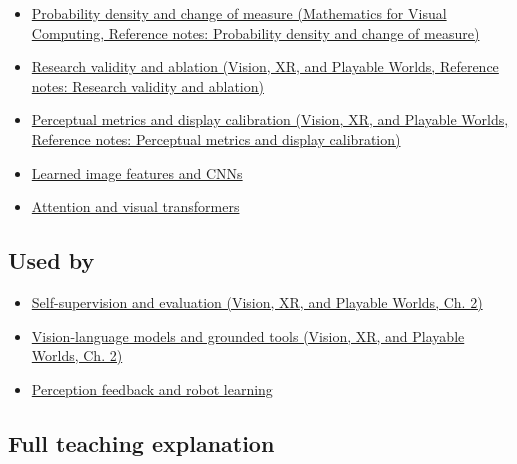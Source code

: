 \hypertarget{appendix-772f1fd96148-prerequisites}{}

\begin{itemize}
\tightlist
\item
  \href{../02-Mathematics-for-Visual-Computing/main.pdf\#nameddest=appendix-4815cd87ab8b}{Probability density and change of measure (Mathematics for Visual Computing, Reference notes: Probability density and change of measure)}
\item
  \href{../07-Vision-XR-and-Playable-Worlds/main.pdf\#nameddest=appendix-65788587ef78}{Research validity and ablation (Vision, XR, and Playable Worlds, Reference notes: Research validity and ablation)}
\item
  \href{../07-Vision-XR-and-Playable-Worlds/main.pdf\#nameddest=appendix-b2c1846508bf}{Perceptual metrics and display calibration (Vision, XR, and Playable Worlds, Reference notes: Perceptual metrics and display calibration)}
\item
  \hyperref[appendix-47c51ea026fb]{Learned image features and CNNs}
\item
  \hyperref[appendix-a9d5dfdd164a]{Attention and visual transformers}
\end{itemize}

\subsection{Used by}\label{appendix-772f1fd96148-used-by}

\hypertarget{appendix-772f1fd96148-used-by}{}

\begin{itemize}
\tightlist
\item
  \href{../07-Vision-XR-and-Playable-Worlds/main.pdf\#nameddest=04-visual-computing-ii-ch031-self-supervision-and-evaluation}{Self-supervision and evaluation (Vision, XR, and Playable Worlds, Ch. 2)}
\item
  \href{../07-Vision-XR-and-Playable-Worlds/main.pdf\#nameddest=04-visual-computing-ii-ch031-vision-language-models-and-grounded-tools}{Vision-language models and grounded tools (Vision, XR, and Playable Worlds, Ch. 2)}
\item
  \hyperref[appendix-b0c42da325f1]{Perception feedback and robot learning}
\end{itemize}

\subsection{Full teaching explanation}\label{appendix-772f1fd96148-full-teaching-explanation}

